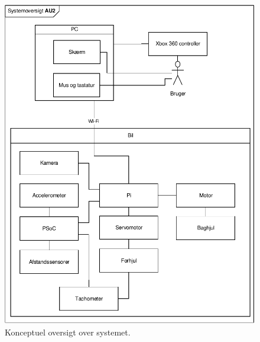 \clearpage

\begin{figure}[ht]
\centering
\includegraphics[width=\textwidth ]{../fig/diagrammer/systemoversigt}
\caption{Konceptuel oversigt over systemet.}
\label{fig:systmeoversigt}
\end{figure}